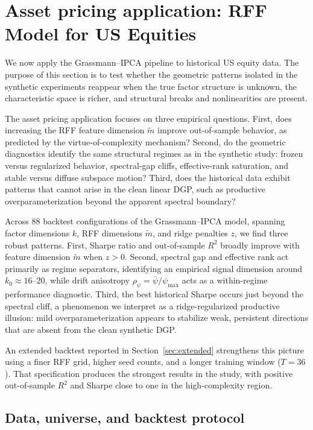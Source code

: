 \documentclass[11pt,letterpaper]{article}
\begin{document}
\section{Asset pricing application: RFF Model for US Equities}
\label{sec:hist_data}

We now apply the Grassmann--IPCA pipeline to historical US equity data. The purpose of this section is to test whether the geometric patterns isolated in the synthetic experiments reappear when the true factor structure is unknown, the characteristic space is richer, and structural breaks and nonlinearities are present.

The asset pricing application focuses on three empirical questions. First, does increasing the RFF feature dimension $\tilde m$ improve out-of-sample behavior, as predicted by the virtue-of-complexity mechanism? Second, do the geometric diagnostics identify the same structural regimes as in the synthetic study: frozen versus regularized behavior, spectral-gap cliffs, effective-rank saturation, and stable versus diffuse subspace motion? Third, does the historical data exhibit patterns that cannot arise in the clean linear DGP,
such as productive overparameterization beyond the apparent spectral boundary?

Across 88 backtest configurations of the Grassmann--IPCA model, spanning
factor dimensions $k$, RFF dimensions $\tilde m$, and ridge penalties $z$, we find
three robust patterns. First, Sharpe ratio and out-of-sample $R^2$ broadly
improve with feature dimension $\tilde m$ when $z>0$. Second, spectral gap and
effective rank act primarily as regime separators, identifying an empirical
signal dimension around $k_0\approx 16$--$20$, while drift anisotropy
$\rho_\psi=\bar\psi/\psi_{\max}$ acts as a within-regime performance
diagnostic. Third, the best historical Sharpe occurs just beyond the spectral
cliff, a phenomenon we interpret as a ridge-regularized productive illusion:
mild overparameterization appears to stabilize weak, persistent directions that
are absent from the clean synthetic DGP.

An extended backtest reported in Section~\ref{sec:extended} strengthens this
picture using a finer RFF grid, higher seed counts, and a longer training window
($T=36$). That specification produces the strongest results in the study, with
positive out-of-sample $R^2$ and Sharpe close to one in the high-complexity
region.

\subsection{Data, universe, and backtest protocol}
\label{sec:hist:setup}
\end{document}
